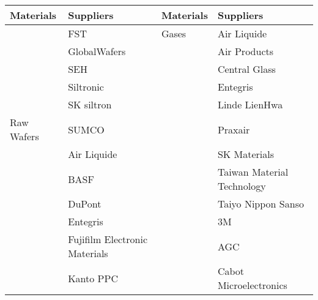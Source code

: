 \begin{table}[H]
\begin{adjustbox}{max width=0.9\textwidth}
\begin{tabular}{@{}llll@{}}
\toprule
Materials                                & Suppliers                     & Materials                           & Suppliers                     \\ \midrule\midrule
                                         & FST                           & Gases                               & Air Liquide                   \\
                                         & GlobalWafers                  &                                     & Air Products                  \\
                                         & SEH                           &                                     & Central Glass                 \\
                                         & Siltronic                     &                                     & Entegris                      \\
                                         & SK siltron                    &                                     & Linde LienHwa                 \\
\multirow{-6}{*}{Raw Wafers}             & SUMCO                         &                                     & Praxair                       \\ \cmidrule(r){1-2}
                                         & Air Liquide                   &                                     & SK Materials                  \\
                                         & BASF                          &                                     & Taiwan Material Technology    \\
                                         & DuPont                        &                                     & Taiyo Nippon Sanso            \\ \cmidrule(l){3-4} 
                                         & Entegris                      &                                     & 3M                            \\
                                         & Fujifilm Electronic Materials &                                     & AGC                           \\
                                         & Kanto PPC                     &                                     & Cabot Microelectronics        \\

\end{tabular}
\end{adjustbox}
\end{table}
